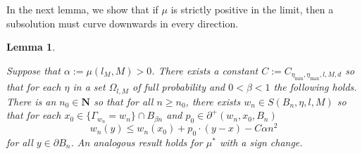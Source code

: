 \documentclass[12pt]{amsart}
\newcommand{\N}{\mathbf{N}}
\newtheorem{lemma}[theorem]{Lemma}
\begin{document}
In the next lemma, we show that if $\mu$ is strictly positive in the limit, then a subsolution must curve downwards in every direction. 


\begin{lemma}\label{strict-convexity}

Suppose that $\alpha := \mu(l_M,M) > 0$. There exists a constant $C := C_{\eta_{\min}, \eta_{\max}, l, M, d}$  so that for each $\eta$ in a set $\Omega_{l,M}$ of full probability and $0 < \beta < 1$ the following holds. There is an $n_0 \in \N$ 
so that for all $n \geq n_0$, there exists $w_n \in S(B_{n}, \eta, l, M)$ so that for each $x_0 \in \{ \Gamma_{w_n} = w_n\} \cap B_{\beta n}$ and $p_0 \in \partial^+(w_n, x_0, B_n)$
\[
w_n(y) \leq w_n(x_0) + p_0 \cdot (y-x) - C \alpha n^2
\]
for all $y \in \partial B_{n}$. An analogous result holds for $\mu^*$ with a sign change. 


\end{lemma}
\end{document}
